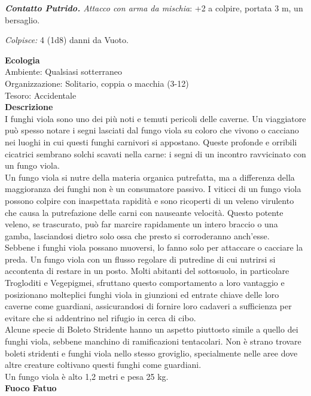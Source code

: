 \begin{multicols}{2}
\emph{\textbf{Contatto Putrido.} Attacco con arma da mischia}: +2 a colpire,  portata 3 m, un bersaglio.

\emph{Colpisce:} 4 (1d8) danni da Vuoto.

\textbf{Ecologia}\\
Ambiente: Qualsiasi sotterraneo\\
Organizzazione: Solitario, coppia o macchia (3-12)\\
Tesoro: Accidentale\\
\textbf{Descrizione}\\
I funghi viola sono uno dei più noti e temuti pericoli delle caverne. Un viaggiatore può spesso notare i segni lasciati dal fungo viola su coloro che vivono o cacciano nei luoghi in cui questi funghi carnivori si appostano. Queste profonde e orribili cicatrici sembrano solchi scavati nella carne: i segni di un incontro ravvicinato con un fungo viola.\\
Un fungo viola si nutre della materia organica putrefatta, ma a differenza della maggioranza dei funghi non è un consumatore passivo. I viticci di un fungo viola possono colpire con inaspettata rapidità e sono ricoperti di un veleno virulento che causa la putrefazione delle carni con nauseante velocità. Questo potente veleno, se trascurato, può far marcire rapidamente un intero braccio o una gamba, lasciandosi dietro solo ossa che presto si corroderanno anch'esse.\\
Sebbene i funghi viola possano muoversi, lo fanno solo per attaccare o cacciare la preda. Un fungo viola con un flusso regolare di putredine di cui nutrirsi si accontenta di restare in un posto. Molti abitanti del sottosuolo, in particolare Trogloditi e Vegepigmei, sfruttano questo comportamento a loro vantaggio e posizionano molteplici funghi viola in giunzioni ed entrate chiave delle loro caverne come guardiani, assicurandosi di fornire loro cadaveri a sufficienza per evitare che si addentrino nel rifugio in cerca di cibo.\\
Alcune specie di Boleto Stridente hanno un aspetto piuttosto simile a quello dei funghi viola, sebbene manchino di ramificazioni tentacolari. Non è strano trovare boleti stridenti e funghi viola nello stesso groviglio, specialmente nelle aree dove altre creature coltivano questi funghi come guardiani.\\

Un fungo viola è alto 1,2 metri e pesa 25 kg.\\


\medskip{}\textbf{Fuoco Fatuo}


\end{multicols}
